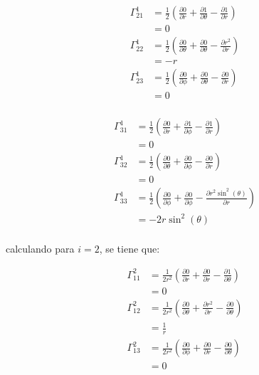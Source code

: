 \documentclass[12pt,letterpaper]{report}
\begin{document}
\hspace{0.5cm}
\begin{minipage}{0.3\linewidth}
    \begin{align*}
        \Gamma^{1}_{21} &= \frac{1}{2} \left(\frac{\partial 0}{\partial r}+ \frac{\partial 1}{\partial \theta} - \frac{\partial 1}{\partial r}\right)\\
&=0\\
\Gamma^{1}_{22} &= \frac{1}{2} \left(\frac{\partial 0}{\partial \theta}+\frac{\partial 0}{\partial \theta}-\frac{\partial r^2}{\partial r} \right)\\
&=-r\\
\Gamma^{1}_{23} &= \frac{1}{2} \left(\frac{\partial 0}{\partial \phi}+\frac{\partial 0}{\partial \theta}-\frac{\partial 0}{\partial r} \right)\\
&=0\\
    \end{align*}
\end{minipage}
\hspace{0.5cm}
\begin{minipage}{0.3\linewidth}
    \begin{align*}
        \Gamma^{1}_{31} &= \frac{1}{2} \left(\frac{\partial 0}{\partial r}+ \frac{\partial 1}{\partial \phi} - \frac{\partial 1}{\partial r}\right)\\
        &=0\\
        \Gamma^{1}_{32} &= \frac{1}{2} \left(\frac{\partial 0}{\partial \theta}+\frac{\partial 0}{\partial \phi}-\frac{\partial 0}{\partial r} \right)\\
        &=0\\
        \Gamma^{1}_{33} &= \frac{1}{2} \left(\frac{\partial 0}{\partial \phi}+\frac{\partial 0}{\partial \phi}-\frac{\partial r^2\sin^2(\theta)}{\partial r} \right)\\
        &=-2r\sin^2(\theta)\\  
    \end{align*}
\end{minipage}
calculando para $i=2$, se tiene que:\\
\begin{minipage}{0.3\linewidth}
    \begin{align*}
        \Gamma^{2}_{11} &= \frac{1}{2r^2} \left(\frac{\partial 0}{\partial r}+ \frac{\partial 0}{\partial r} - \frac{\partial 1}{\partial \theta}\right)\\
        &=0\\
        \Gamma^{2}_{12} &= \frac{1}{2r^2} \left(\frac{\partial 0}{\partial \theta}+\frac{\partial r^2}{\partial r}-\frac{\partial 0}{\partial \theta} \right)\\
        &=\frac{1}{r}\\
        \Gamma^{2}_{13} &= \frac{1}{2r^2} \left(\frac{\partial 0}{\partial \phi}+\frac{\partial 0}{\partial r}-\frac{\partial 0}{\partial \theta} \right)\\
        &=0\\
    \end{align*}
\end{minipage}
\end{document}
